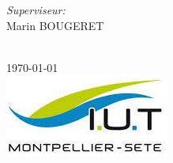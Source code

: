 \documentclass{article}
\begin{document}
\begin{titlepage}
\begin{minipage}{0.4\textwidth}
\end{minipage}
\begin{minipage}{0.4\textwidth}
\begin{flushright} \large
\emph{Superviseur:} \\
Marin \textsc{BOUGERET} %
\end{flushright}
\end{minipage}\\[1cm]
{\large \today}\\[1cm] %
\includegraphics{.ressources/logo.jpeg}%
\vfill %
\end{titlepage}

\makeatletter
{}
\makeatother

\tableofcontents
\newpage


\end{document}
